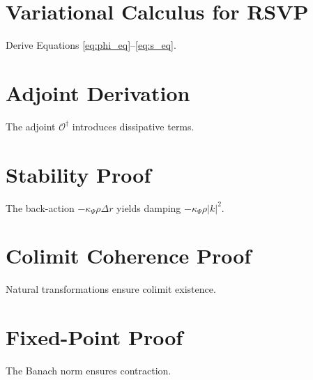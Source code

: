 \documentclass[12pt]{book}
\theoremstyle{definition}
\begin{document}
\section{Variational Calculus for RSVP}
Derive Equations \eqref{eq:phi_eq}–\eqref{eq:s_eq}.

\section{Adjoint Derivation}
The adjoint \(\mathcal{O}^\dagger\) introduces dissipative terms.

\section{Stability Proof}
The back-action \(-\kappa_\Psi \rho \Delta r\) yields damping \(-\kappa_\Psi \rho |k|^2\).

\section{Colimit Coherence Proof}
Natural transformations ensure colimit existence.

\section{Fixed-Point Proof}
The Banach norm ensures contraction.
\end{document}
